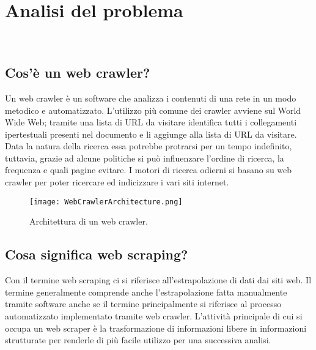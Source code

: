 
\chapter{Analisi del problema}
\label{cap:analisi-del-problema}

\\

\section{Cos'è un web crawler?}

Un web crawler è un software che analizza i contenuti di una rete in un modo metodico e automatizzato. L'utilizzo più comune dei crawler avviene sul World Wide Web; tramite una lista di URL da visitare identifica tutti i collegamenti ipertestuali presenti nel documento e li aggiunge alla lista di URL da visitare. Data la natura della ricerca essa potrebbe protrarsi per un tempo indefinito, tuttavia, grazie ad alcune politiche si può influenzare l'ordine di ricerca, la frequenza e quali pagine evitare. I motori di ricerca odierni si basano su web crawler per poter ricercare ed indicizzare i vari siti internet.

\begin{figure}[!h] 
    \centering 
    \texttt{[image: WebCrawlerArchitecture.png]} 
    \caption{Architettura di un web crawler.}
\end{figure}

\section{Cosa significa web scraping?}

Con il termine web scraping ci si riferisce all'estrapolazione di dati dai siti web. Il termine generalmente comprende anche l'estrapolazione fatta manualmente tramite software anche se il termine principalmente si riferisce al processo automatizzato implementato tramite web crawler. L'attività principale di cui si occupa un web scraper è la trasformazione di informazioni libere in informazioni strutturate per renderle di più facile utilizzo per una successiva analisi. 

